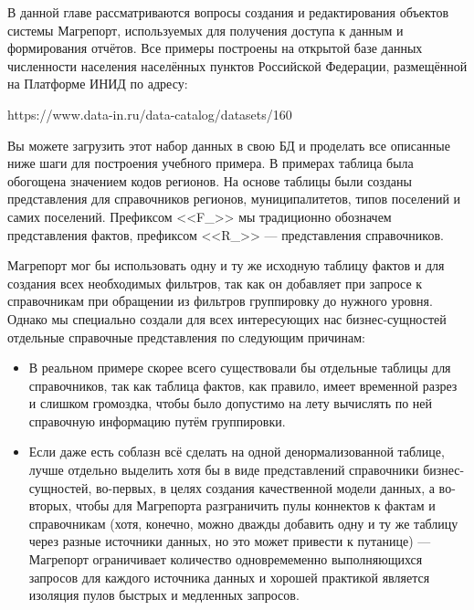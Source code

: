 \documentclass[../user-manual.tex]{subfiles}
\begin{document}
	
	В данной главе рассматриваются вопросы создания и редактирования объектов системы Магрепорт, используемых для получения доступа к данным и формирования отчётов. Все примеры построены на открытой базе данных численности населения населённых пунктов Российской Федерации, размещённой на Платформе ИНИД по адресу:
	
	\begin{boxed}
		https://www.data-in.ru/data-catalog/datasets/160
	\end{boxed}
	
	Вы можете загрузить этот набор данных в свою БД и проделать все описанные ниже шаги для построения учебного примера. В примерах таблица была обогощена значением кодов регионов. На основе таблицы были созданы представления для справочников регионов, муниципалитетов, типов поселений и самих поселений. Префиксом <<F\_>> мы традиционно обозначем представления фактов, префиксом <<R\_>> --- представления справочников.
	
	\begin{concept}
		Магрепорт мог бы использовать одну и ту же исходную таблицу фактов и для создания всех необходимых фильтров, так как он добавляет при запросе к справочникам при обращении из фильтров группировку до нужного уровня. Однако мы специально создали для всех интересующих нас бизнес-сущностей отдельные справочные представления по следующим причинам:
		
		\begin{itemize}
			\item В реальном примере скорее всего существовали бы отдельные таблицы для справочников, так как таблица фактов, как правило, имеет временной разрез и слишком громоздка, чтобы было допустимо на лету вычислять по ней справочную информацию путём группировки.
			
		\end{itemize}
	\end{concept}
	
	\begin{boxed}

		\begin{itemize}

		
		\item Если даже есть соблазн всё сделать на одной денормализованной таблице, лучше отдельно выделить хотя бы в виде представлений справочники бизнес-сущностей, во-первых, в целях создания качественной модели данных, а во-вторых, чтобы для Магрепорта разграничить пулы коннектов к фактам и справочникам (хотя, конечно, можно дважды добавить одну и ту же таблицу через разные источники данных, но это может привести к путанице) --- Магрепорт ограничивает количество одновремеменно выполняющихся запросов для каждого источника данных и хорошей практикой является изоляция пулов быстрых и медленных запросов.
		\end{itemize}
	\end{boxed}
\end{document}
